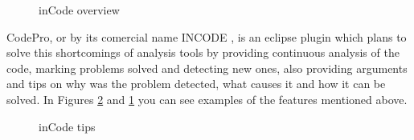 \begin{figure}[h]
\centering
{}
\caption{inCode overview \cite{tools:inCode} \label{fig:inCodeOverview}}
\end{figure}

	CodePro, or by its comercial name INCODE \cite{site:inCode}, is an eclipse
plugin which plans to solve this shortcomings of analysis tools by providing
continuous analysis of the code, marking problems solved and detecting new ones,
also providing arguments and tips on why was the problem detected, what causes
it and how it can be solved. In Figures \ref{fig:inCodeTips} and
\ref{fig:inCodeOverview} you can see examples of the features mentioned above.

\begin{figure}
\centering
{}
\caption{inCode tips \cite{tools:inCode} \label{fig:inCodeTips}}
\end{figure}



